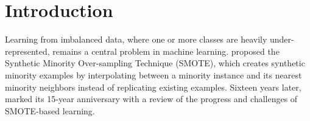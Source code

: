 \section{Introduction}
\label{sec:introduction}

Learning from imbalanced data, where one or more classes are heavily under-represented, remains a central problem in machine learning. \textcite{chawla2002smote} proposed the Synthetic Minority Over-sampling Technique (SMOTE), which creates synthetic minority examples by interpolating between a minority instance and its nearest minority neighbors instead of replicating existing examples. Sixteen years later, \textcite{fernandez2018smote} marked its 15-year anniversary with a review of the progress and challenges of SMOTE-based learning. 


